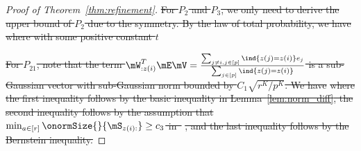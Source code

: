 \documentclass[lettersize,onecolumn,journal]{IEEEtran}
\theoremstyle{definition}
\theoremstyle{definition}
\newcommand{\of}[1]{\left(#1\right)}
\newcommand{\ang}[1]{\left\langle#1\right\rangle}
\providecommand{\DIFdeltex}[1]{{\protect\color{red}\sout{#1}}}                      %
\providecommand{\DIFdel}[1]{\texorpdfstring{\DIFdeltex{#1}}{}} %
\begin{document}
\begin{proof}[Proof of Theorem~\ref{thm:refinement}]
\DIFdel{For $P_2$ and $P_3$, we only need to derive the upper bound of $P_2$ due to the symmetry. By the law of total probability, we have 
    }%
\DIFdel{where with some positive constant $t$
    }%

\DIFdel{For $P_{21}$, note that the term $\mW^T_{: z(i)} \mE \mV = \frac{ \sum_{ j \neq i, j \in [p]} \ind \{ z(j) = z(i) \} e_j }{\sum_{j \in [p]} \ind \{ z(j) = z(i) \} }$  is a sub-Gaussian vector with sub-Gaussian norm bounded by $C_1 \sqrt{r^K/ p^K}$. We have
    }%
\DIFdel{where the first inequality follows by the basic inequality in Lemma~\ref{lem:norm_diff}, the second inequality follows by the assumption that $ \min_{a \in [r]} \onormSize{}{\mS_{z(i):}} \geq c_3$ in~}%
\DIFdel{, and the last inequality follows by the Bernstein inequality.
    }%


\end{proof}
\end{document}
